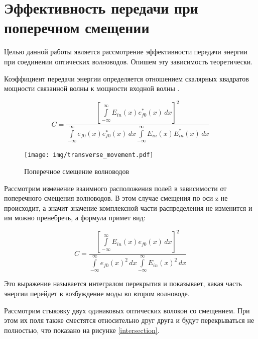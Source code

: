 \section{Эффективность передачи при поперечном смещении}

Целью данной работы является рассмотрение эффективности передачи энергии при соединении оптических волноводов. Опишем эту зависимость теоретически.

Коэффициент передачи энергии определяется отношением скалярных квадратов мощности связанной волны к мощности входной волны \cite{lefevre}.

\begin{equation}
	\label{coupling_full}
	C = \frac{\left[\int\limits_{-\infty}^{\infty}E_{in}(x)e_{f0}^*(x) \,dx\right]^2}
	{\int\limits_{-\infty}^{\infty}e_{f0}(x)e_{f0}^*(x) \,dx
	 \int\limits_{-\infty}^{\infty}E_{in}(x)E_{in}^*(x) \,dx}
\end{equation}

\begin{figure}[h!]
	\texttt{[image: img/transverse\_movement.pdf]}
	\caption{Поперечное смещение волноводов}
	\label{transverse_movement}
\end{figure}

Рассмотрим изменение взаимного расположения полей в зависимости от поперечного смещения волноводов. В этом случае смещения по оси z не происходит, а значит значение комплексной части распределения не изменится и им можно пренебречь, а формула примет вид:

\begin{equation}
	\label{coupling_natural}
	C = \frac{\left[\int\limits_{-\infty}^{\infty}E_{in}(x)e_{f0}(x) \,dx\right]^2}
	{\int\limits_{-\infty}^{\infty}e_{f0}(x)^2 \,dx
	 \int\limits_{-\infty}^{\infty}E_{in}(x)^2 \,dx}
\end{equation}

Это выражение называется интегралом перекрытия  и показывает, какая часть энергии перейдет в возбуждение моды во втором волноводе. 

Рассмотрим стыковку двух одинаковых оптических волокон со смещением. При этом их поля также сместятся относительно друг друга и будут перекрываться не полностью, что показано на рисунке \ref{intersection}.


